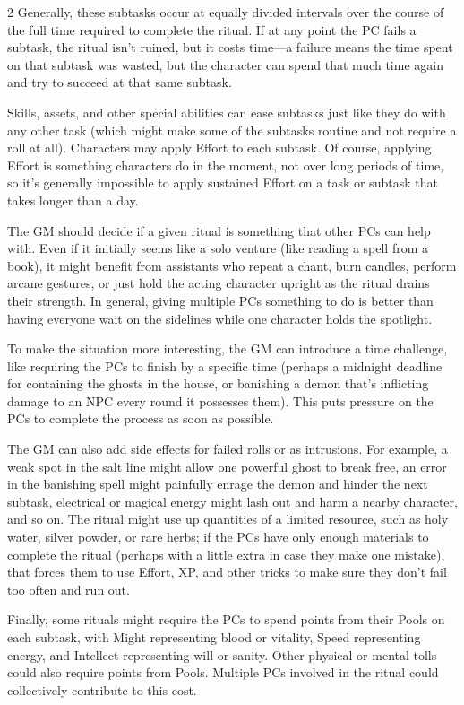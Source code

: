 \begin{multicols}{2}
Generally, these subtasks occur at equally divided intervals over the course of the full time required to complete the ritual. If at any point the PC fails a subtask, the ritual isn’t ruined, but it costs time—a failure means the time spent on that subtask was wasted, but the character can spend that much time again and try to succeed at that same subtask.

Skills, assets, and other special abilities can ease subtasks just like they do with any other task (which might make some of the subtasks routine and not require a roll at all). Characters may apply Effort to each subtask. Of course, applying Effort is something characters do in the moment, not over long periods of time, so it’s generally impossible to apply sustained Effort on a task or subtask that takes longer than a day.

The GM should decide if a given ritual is something that other PCs can help with. Even if it initially seems like a solo venture (like reading a spell from a book), it might benefit from assistants who repeat a chant, burn candles, perform arcane gestures, or just hold the acting character upright as the ritual drains their strength. In general, giving multiple PCs something to do is better than having everyone wait on the sidelines while one character holds the spotlight.

To make the situation more interesting, the GM can introduce a time challenge, like requiring the PCs to finish by a specific time (perhaps a midnight deadline for containing the ghosts in the house, or banishing a demon that’s inflicting damage to an NPC every round it possesses them). This puts pressure on the PCs to complete the process as soon as possible.

The GM can also add side effects for failed rolls or as intrusions. For example, a weak spot in the salt line might allow one powerful ghost to break free, an error in the banishing spell might painfully enrage the demon and hinder the next subtask, electrical or magical energy might lash out and harm a nearby character, and so on. The ritual might use up quantities of a limited resource, such as holy water, silver powder, or rare herbs; if the PCs have only enough materials to complete the ritual (perhaps with a little extra in case they make one mistake), that forces them to use Effort, XP, and other tricks to make sure they don’t fail too often and run out.

Finally, some rituals might require the PCs to spend points from their Pools on each subtask, with Might representing blood or vitality, Speed representing energy, and Intellect representing will or sanity. Other physical or mental tolls could also require points from Pools. Multiple PCs involved in the ritual could collectively contribute to this cost.


\end{multicols}
